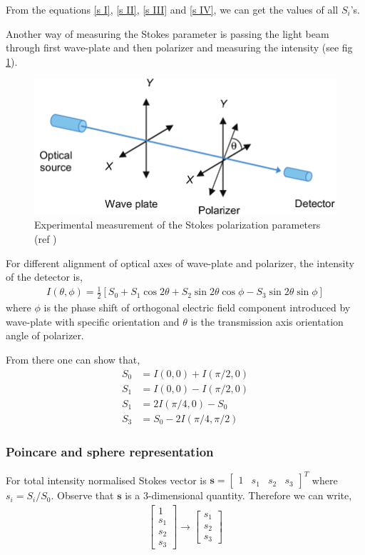 \documentclass[11pt,a4paper]{article}
\numberwithin{equation}{section}
\begin{document}
From the equations \ref{s I}, \ref{s II}, \ref{s III} and \ref{s IV}, we can get the values of all $S_i$'s.

Another way of measuring the  Stokes parameter is passing the light beam through first wave-plate and then polarizer and measuring the intensity (see fig \ref{fig:stokes-para}).
\begin{figure}[H]
	\centering
	\includegraphics[width=0.6\linewidth]{"stokes para"}
	\caption{Experimental measurement of the Stokes polarization parameters (ref \cite{collett 05}) }
	\label{fig:stokes-para}
\end{figure}
For different alignment of optical axes of wave-plate and polarizer, the intensity of the detector is,
\begin{align}
	I(\theta,\phi) = \frac{1}{2}[S_0+S_1\cos2\theta+S_2\sin2\theta\cos\phi-S_3\sin2\theta\sin\phi]
\end{align}
where $\phi$ is the phase shift of orthogonal electric field component introduced by wave-plate with specific orientation and $\theta$ is the transmission axis orientation angle of polarizer. \cite{goldstein 11}\cite{collett 05}

From there one can show that, 
\begin{align}
	S_0&=I(0,0)+I(\pi/2,0)\\
	S_1&=I(0,0)-I(\pi/2,0)\\
	S_1&=2I(\pi/4,0)-S_0\\
	S_3&=S_0-2I(\pi/4,\pi/2)
\end{align}


\subsubsection{Poincare  and sphere representation}
For total intensity normalised Stokes vector is $\boldsymbol{s}= \begin{bmatrix} 1& s_1& s_2& s_3\end{bmatrix}^T$ where $s_i=S_i/S_0$. Observe that $ \boldsymbol{s} $ is a 3-dimensional quantity. Therefore we can write, 
\begin{align*}
	\begin{bmatrix} 1\\ s_1\\ s_2\\ s_3\end{bmatrix} \rightarrow 
	\begin{bmatrix} s_1\\ s_2\\ s_3\end{bmatrix}
\end{align*}
\end{document}
